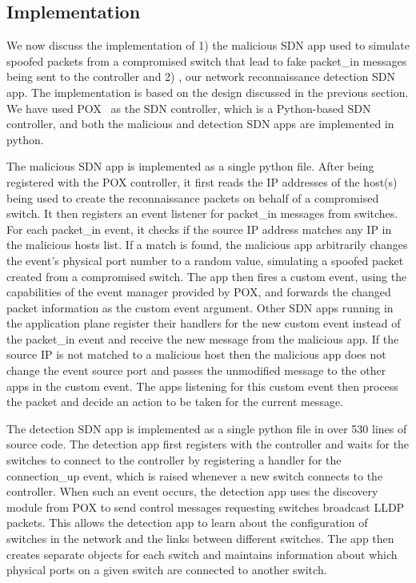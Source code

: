 \subsection{Implementation}

We now discuss the implementation of 1) the malicious SDN app used to
simulate spoofed packets from a compromised switch that lead to fake 
packet\_in messages being sent to the controller and 2) \name, our 
network reconnaissance detection SDN app. The implementation is based on
the design discussed in the previous section. We have used 
POX~\cite{poxWiki} as the SDN controller, which is a Python-based SDN
controller, and both the malicious and detection SDN apps are
implemented in python. 

 The malicious SDN app is implemented as a
single python file. After being registered with the POX controller, it
first reads the IP addresses of the host(s) being used to create the
reconnaissance packets on behalf of a compromised switch. It then
registers an event listener for packet\_in messages from switches. For
each packet\_in event, it checks if the source IP address matches any
IP in the malicious hosts list. If a match is found, the malicious app
arbitrarily changes the event's physical port number to a random value,
simulating a spoofed packet created from a compromised switch. The app
then fires a custom event, using the capabilities of the event manager
provided by POX, and forwards the changed packet information as the 
custom event argument. Other SDN apps running in the application plane 
register their handlers for the new custom event instead of the 
packet\_in event and receive the new message from the malicious app. If
the source IP is not matched to a malicious host then the malicious app
does not change the event source port and passes the unmodified message
to the other apps in the custom event. The apps listening for this
custom event then process the packet and decide an action to be taken
for the current message.

 The detection SDN app is implemented as a
single python file in over 530 lines of source code. The detection app
first registers with the controller and waits for the switches to 
connect to the controller by registering a handler for the 
connection\_up event, which is raised whenever a new switch connects to
the controller. When such an event occurs, the detection app uses the 
discovery module from POX to send control messages requesting switches 
broadcast LLDP packets. This allows the detection app to learn about the
configuration of switches in the network and the links between different
switches. The app then creates separate objects for each switch and 
maintains information about which physical ports on a given switch are
connected to another switch. 

